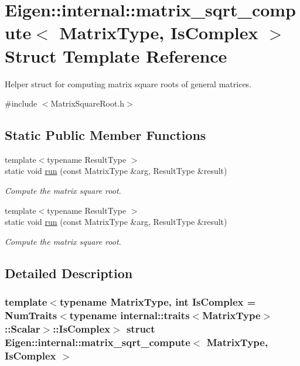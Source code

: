 \hypertarget{struct_eigen_1_1internal_1_1matrix__sqrt__compute}{}\section{Eigen\+:\+:internal\+:\+:matrix\+\_\+sqrt\+\_\+compute$<$ Matrix\+Type, Is\+Complex $>$ Struct Template Reference}
\label{struct_eigen_1_1internal_1_1matrix__sqrt__compute}


Helper struct for computing matrix square roots of general matrices.  




{\ttfamily \#include $<$Matrix\+Square\+Root.\+h$>$}

\subsection*{Static Public Member Functions}
\begin{DoxyCompactItemize}
\item 
{\footnotesize template$<$typename Result\+Type $>$ }\\static void \hyperlink{struct_eigen_1_1internal_1_1matrix__sqrt__compute_a29c137f6d7c0cbe4df034be5aed427f6}{run} (const Matrix\+Type \&arg, Result\+Type \&result)
\begin{DoxyCompactList}\small\item\em Compute the matrix square root. \end{DoxyCompactList}\item 
{\footnotesize template$<$typename Result\+Type $>$ }\\static void \hyperlink{struct_eigen_1_1internal_1_1matrix__sqrt__compute_a29c137f6d7c0cbe4df034be5aed427f6}{run} (const Matrix\+Type \&arg, Result\+Type \&result)
\begin{DoxyCompactList}\small\item\em Compute the matrix square root. \end{DoxyCompactList}\end{DoxyCompactItemize}


\subsection{Detailed Description}
\subsubsection*{template$<$typename Matrix\+Type, int Is\+Complex = Num\+Traits$<$typename internal\+::traits$<$\+Matrix\+Type$>$\+::\+Scalar$>$\+::\+Is\+Complex$>$\newline
struct Eigen\+::internal\+::matrix\+\_\+sqrt\+\_\+compute$<$ Matrix\+Type, Is\+Complex $>$}

